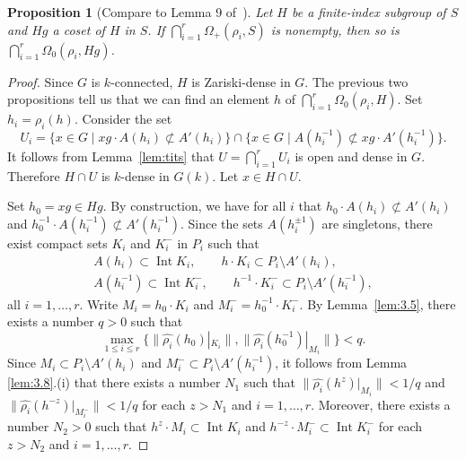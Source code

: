 \documentclass{amsart}
\theoremstyle{plain}
\newtheorem{proposition}[theorem]{Proposition}
\theoremstyle{definition}
\theoremstyle{remark}
\DeclareMathOperator{\Int}{Int}
\providecommand{\norm}[1]{\lVert#1\rVert}
\begin{document}
\begin{proposition}[Compare to Lemma 9 of~\cite{MR613853}]\label{prop:coset}
Let $H$ be a finite-index subgroup of $S$ and $Hg$ a coset of $H$ in $S$. If 
$\bigcap_{i = 1}^{r} \Omega_{+}(\rho_{i}, S)$ is nonempty, then so is
$\bigcap_{i = 1}^{r} \Omega_{0}(\rho_{i}, Hg)$.
\end{proposition}
\begin{proof}
Since $G$ is $k$-connected, $H$ is Zariski-dense in $G$. The previous two
propositions tell us that we can find an element $h$ of $\bigcap_{i = 1}^{r}
\Omega_{0}(\rho_{i}, H)$. Set $h_{i} = \rho_{i}(h)$. Consider
the set
$$U_{i} = \{x \in G \mid xg \cdot A(h_{i}) \not\subset A'(h_{i})\}
\cap \{x \in G \mid A(h_{i}^{-1}) \not\subset xg \cdot A'(h_{i}^{-1})\}.$$
It follows from Lemma~\ref{lem:tits} that $U = \bigcap_{i = 1}^{r} U_{i}$
is open and dense in $G$. Therefore $H \cap U$ is $k$-dense in $G(k)$. Let $x \in H \cap
U$.

Set $h_{0} = xg \in Hg$. By construction, we have for all $i$ that $h_{0}\cdot A(h_{i})
\not\subset A'(h_{i})$ and $h_{0}^{-1}\cdot A(h_{i}^{-1}) \not\subset A'(h_{i}^{-1})$.
Since the sets $A(h_{i}^{\pm 1})$ are singletons, there exist compact sets $K_{i}$ and
$K_{i}^{-}$ in $P_{i}$ such that
\begin{gather*}
A(h_{i}) \subset \Int K_{i}, \qquad h\cdot K_{i} \subset P_{i}\setminus
A'(h_{i}),\\
A(h_{i}^{-1}) \subset \Int K_{i}^{-}, \qquad h^{-1}\cdot K_{i}^{-} \subset P_{i}\setminus
A'(h_{i}^{-1}),
\end{gather*}
all $i = 1,\ldots, r$. Write $M_{i} = h_{0}\cdot K_{i}$ and $M_{i}^{-} = h_{0}^{-1}\cdot
K_{i}^{-}$. By Lemma~\ref{lem:3.5}, there exists a number $q > 0$ such that
$$\max_{1\leqslant i \leqslant r}\{\norm{\widehat{\rho_{i}}(h_{0})|_{K_{i}}}, \norm{
\widehat{\rho_{i}}(h_{0}^{-1})|_{M_{i}}}\} < q.$$
Since $M_{i} \subset P_{i} \setminus A'(h_{i})$ and $M_{i}^{-} \subset P_{i} \setminus
A'(h_{i}^{-1})$, it follows from Lemma \ref{lem:3.8}.(i) that there exists a number
$N_{1}$ such that $\norm{\widehat{\rho_{i}}(h^{z})|_{M_{i}}} < 1/q$ and
$\norm{\widehat{\rho_{i}}(h^{-z})|_{M_{i}^{-}}} < 1/q$ for each $z > N_{1}$ and $i
= 1,\ldots,r$. Moreover, there exists a number $N_{2} > 0$ such that $h^{z}\cdot M_{i}
\subset \Int K_{i}$ and $h^{-z}\cdot M_{i}^{-}
\subset \Int K_{i}^{-}$ for each $z > N_{2}$ and $i = 1,\ldots, r$.


\end{proof}
\end{document}
